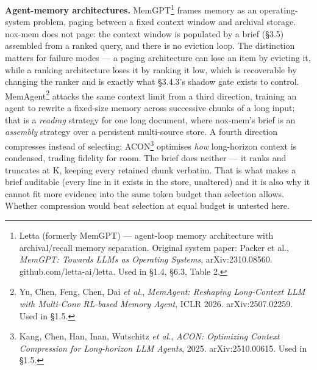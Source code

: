 \documentclass[
]{article}
\begin{document}
\textbf{Agent-memory architectures.} MemGPT\footnote{Letta (formerly
  MemGPT) --- agent-loop memory architecture with archival/recall memory
  separation. Original system paper: Packer et al., \emph{MemGPT:
  Towards LLMs as Operating Systems}, arXiv:2310.08560.
  github.com/letta-ai/letta. Used in §1.4, §6.3, Table 2.} frames memory
as an operating-system problem, paging between a fixed context window
and archival storage. nox-mem does not page: the context window is
populated by a brief (§3.5) assembled from a ranked query, and there is
no eviction loop. The distinction matters for failure modes --- a paging
architecture can lose an item by evicting it, while a ranking
architecture loses it by ranking it low, which is recoverable by
changing the ranker and is exactly what §3.4.3's shadow gate exists to
control. MemAgent\footnote{Yu, Chen, Feng, Chen, Dai \emph{et al.},
  \emph{MemAgent: Reshaping Long-Context LLM with Multi-Conv RL-based
  Memory Agent}, ICLR 2026. arXiv:2507.02259. Used in §1.5.} attacks the
same context limit from a third direction, training an agent to rewrite
a fixed-size memory across successive chunks of a long input; that is a
\emph{reading} strategy for one long document, where nox-mem's brief is
an \emph{assembly} strategy over a persistent multi-source store. A
fourth direction compresses instead of selecting: ACON\footnote{Kang,
  Chen, Han, Inan, Wutschitz \emph{et al.}, \emph{ACON: Optimizing
  Context Compression for Long-horizon LLM Agents}, 2025.
  arXiv:2510.00615. Used in §1.5.} optimises \emph{how} long-horizon
context is condensed, trading fidelity for room. The brief does neither
--- it ranks and truncates at K, keeping every retained chunk verbatim.
That is what makes a brief auditable (every line in it exists in the
store, unaltered) and it is also why it cannot fit more evidence into
the same token budget than selection allows. Whether compression would
beat selection at equal budget is untested here.
\end{document}

